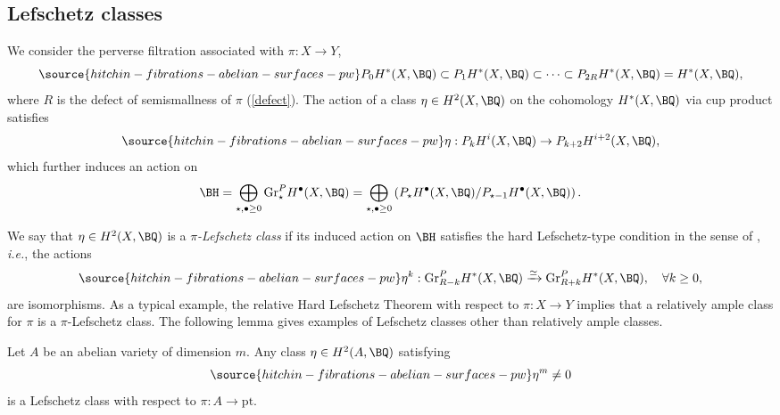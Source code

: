 \subsection{Lefschetz classes}\label{Lefschetz classes}
We consider the perverse filtration associated with $\pi: X \to Y$,
\begin{equation}\label{e50}
\source{hitchin-fibrations-abelian-surfaces-pw}
P_0H^\ast(X, \BQ) \subset P_1H^\ast(X, \BQ) \subset \dots \subset P_{2{R}}H^\ast(X, \BQ) =  H^\ast(X, \BQ),
\end{equation}
where ${R}$ is the defect of semismallness  of $\pi$ (\ref{defect}). The action of a class $\eta \in H^2(X, \BQ)$ on the cohomology $H^*(X, \BQ)$ via cup product satisfies
\begin{equation}\label{e51}
\source{hitchin-fibrations-abelian-surfaces-pw}
\eta: P_kH^i(X, \BQ) \to P_{k+2}H^{i+2}(X, \BQ),
\end{equation}
which further induces an action on
\[
\BH = \bigoplus_{\star,\bullet\geq 0} \mathrm{Gr}_\star^P H^{\bullet}(X, \BQ)= \bigoplus_{\star,\bullet \geq 0} \left( P_\star H^{\bullet}(X, \BQ)/P_{\star-1}H^{\bullet}(X, \BQ) \right).
\]


 We say that  $\eta \in H^2(X, \BQ)$  is a \emph{$\pi$-Lefschetz class}  if its induced action on $\BH$ satisfies the hard Lefschetz-type condition in the sense of \cite[Assumption 2.3.1]{dC}, \emph{i.e.}, the actions
\begin{equation}\label{pi-lefschetz}
\source{hitchin-fibrations-abelian-surfaces-pw}
\eta^k: \mathrm{Gr}^P_{{R} -k}H^*(X, \BQ) \xrightarrow{\simeq}  \mathrm{Gr}^P_{{R}+k}H^*(X, \BQ), \quad \forall k\geq 0,
\end{equation}
are isomorphisms. As a typical example, the relative Hard Lefschetz Theorem \cite{BBD} with respect to $\pi: X \to Y$ implies that a relatively ample class for $\pi$  is a $\pi$-Lefschetz class. The following lemma gives examples of Lefschetz classes other than relatively ample classes.

\begin{lem}
\notready\label{Lemma3.1}
Let $A$ be an abelian variety of dimension $m$. Any class $\eta \in H^2(A, \BQ)$ satisfying
\begin{equation}\label{eta1}
\source{hitchin-fibrations-abelian-surfaces-pw}
\eta^m \neq 0
\end{equation}
is a Lefschetz class with respect to $\pi: A \to \mathrm{pt}$.
\end{lem}

